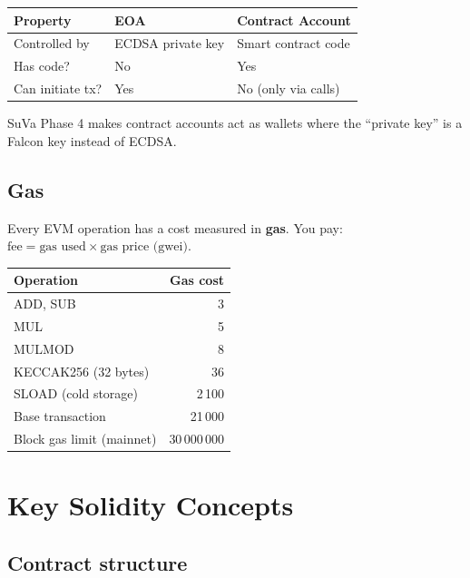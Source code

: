 \documentclass[11pt,a4paper]{article}
\begin{document}
\begin{center}
\begin{tabular}{lll}
\toprule
\textbf{Property} & \textbf{EOA} & \textbf{Contract Account} \\
\midrule
Controlled by & ECDSA private key & Smart contract code \\
Has code?     & No  & Yes \\
Can initiate tx? & Yes & No (only via calls) \\
\bottomrule
\end{tabular}
\end{center}

SuVa Phase 4 makes contract accounts act as wallets where the ``private key'' is a Falcon key instead of ECDSA.

\subsection{Gas}

Every EVM operation has a cost measured in \textbf{gas}. You pay: $\text{fee} = \text{gas used} \times \text{gas price (gwei)}$.

\begin{center}
\begin{tabular}{lr}
\toprule
\textbf{Operation} & \textbf{Gas cost} \\
\midrule
ADD, SUB                & 3 \\
MUL                     & 5 \\
MULMOD                  & 8 \\
KECCAK256 (32 bytes)    & 36 \\
SLOAD (cold storage)    & 2\,100 \\
Base transaction        & 21\,000 \\
Block gas limit (mainnet) & 30\,000\,000 \\
\bottomrule
\end{tabular}
\end{center}

\section{Key Solidity Concepts}

\subsection{Contract structure}
\end{document}
